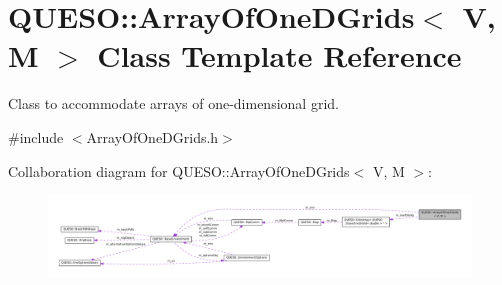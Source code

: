 \hypertarget{class_q_u_e_s_o_1_1_array_of_one_d_grids}{\section{Q\-U\-E\-S\-O\-:\-:Array\-Of\-One\-D\-Grids$<$ V, M $>$ Class Template Reference}
\label{class_q_u_e_s_o_1_1_array_of_one_d_grids}
}


Class to accommodate arrays of one-\/dimensional grid.  




{\ttfamily \#include $<$Array\-Of\-One\-D\-Grids.\-h$>$}



Collaboration diagram for Q\-U\-E\-S\-O\-:\-:Array\-Of\-One\-D\-Grids$<$ V, M $>$\-:
\nopagebreak
\begin{figure}[H]
\begin{center}
\leavevmode
\includegraphics[width=350pt]{class_q_u_e_s_o_1_1_array_of_one_d_grids__coll__graph}
\end{center}
\end{figure}
